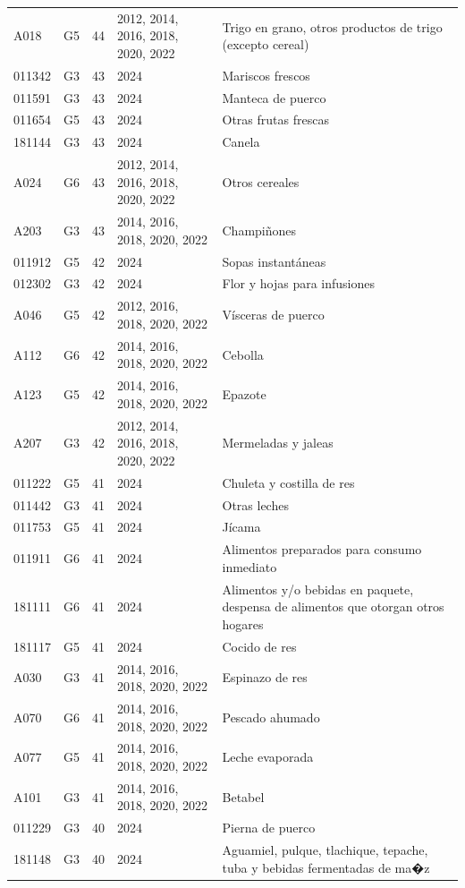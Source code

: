 \begin{table}[ht]
\begin{tabular}{llrll}
  A018 & G5 &  44 & 2012, 2014, 2016, 2018, 2020, 2022 & Trigo en grano, otros productos de trigo (excepto cereal) \\ 
  011342 & G3 &  43 & 2024 & Mariscos frescos \\ 
  011591 & G3 &  43 & 2024 & Manteca de puerco \\ 
  011654 & G5 &  43 & 2024 & Otras frutas frescas \\ 
  181144 & G3 &  43 & 2024 & Canela \\ 
  A024 & G6 &  43 & 2012, 2014, 2016, 2018, 2020, 2022 & Otros cereales \\ 
  A203 & G3 &  43 & 2014, 2016, 2018, 2020, 2022 & Champiñones \\ 
  011912 & G5 &  42 & 2024 & Sopas instantáneas \\ 
  012302 & G3 &  42 & 2024 & Flor y hojas para infusiones \\ 
  A046 & G5 &  42 & 2012, 2016, 2018, 2020, 2022 & Vísceras de puerco \\ 
  A112 & G6 &  42 & 2014, 2016, 2018, 2020, 2022 & Cebolla \\ 
  A123 & G5 &  42 & 2014, 2016, 2018, 2020, 2022 & Epazote \\ 
  A207 & G3 &  42 & 2012, 2014, 2016, 2018, 2020, 2022 & Mermeladas y jaleas \\ 
  011222 & G5 &  41 & 2024 & Chuleta y costilla de res \\ 
  011442 & G3 &  41 & 2024 & Otras leches \\ 
  011753 & G5 &  41 & 2024 & Jícama \\ 
  011911 & G6 &  41 & 2024 & Alimentos preparados para consumo inmediato \\ 
  181111 & G6 &  41 & 2024 & Alimentos y/o bebidas en paquete, despensa de alimentos que otorgan otros hogares \\ 
  181117 & G5 &  41 & 2024 & Cocido de res \\ 
  A030 & G3 &  41 & 2014, 2016, 2018, 2020, 2022 & Espinazo de res \\ 
  A070 & G6 &  41 & 2014, 2016, 2018, 2020, 2022 & Pescado ahumado \\ 
  A077 & G5 &  41 & 2014, 2016, 2018, 2020, 2022 & Leche evaporada \\ 
  A101 & G3 &  41 & 2014, 2016, 2018, 2020, 2022 & Betabel \\ 
  011229 & G3 &  40 & 2024 & Pierna de puerco \\ 
  181148 & G3 &  40 & 2024 & Aguamiel, pulque, tlachique, tepache, tuba y bebidas fermentadas de ma�z \\ 

\end{tabular}
\end{table}
